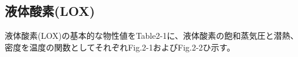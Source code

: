 \subsection{液体酸素(LOX)}
液体酸素(LOX)の基本的な物性値をTable2-1に、液体酸素の飽和蒸気圧と潜熱、密度を温度の関数としてそれぞれFig.2-1およびFig.2-2ひ示す。

